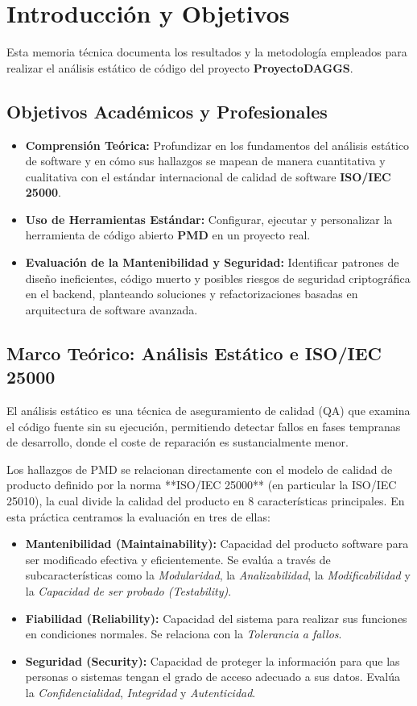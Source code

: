 \documentclass[12pt,a4paper]{article}
\begin{document}
\section{Introducción y Objetivos}
Esta memoria técnica documenta los resultados y la metodología empleados para realizar el análisis estático de código del proyecto \textbf{ProyectoDAGGS}.

\subsection{Objetivos Académicos y Profesionales}
\begin{itemize}
    \item \textbf{Comprensión Teórica:} Profundizar en los fundamentos del análisis estático de software y en cómo sus hallazgos se mapean de manera cuantitativa y cualitativa con el estándar internacional de calidad de software \textbf{ISO/IEC 25000}.
    \item \textbf{Uso de Herramientas Estándar:} Configurar, ejecutar y personalizar la herramienta de código abierto \textbf{PMD} en un proyecto real.
    \item \textbf{Evaluación de la Mantenibilidad y Seguridad:} Identificar patrones de diseño ineficientes, código muerto y posibles riesgos de seguridad criptográfica en el backend, planteando soluciones y refactorizaciones basadas en arquitectura de software avanzada.
\end{itemize}

\subsection{Marco Teórico: Análisis Estático e ISO/IEC 25000}
El análisis estático es una técnica de aseguramiento de calidad (QA) que examina el código fuente sin su ejecución, permitiendo detectar fallos en fases tempranas de desarrollo, donde el coste de reparación es sustancialmente menor.

Los hallazgos de PMD se relacionan directamente con el modelo de calidad de producto definido por la norma **ISO/IEC 25000** (en particular la ISO/IEC 25010), la cual divide la calidad del producto en 8 características principales. En esta práctica centramos la evaluación en tres de ellas:
\begin{itemize}
    \item \textbf{Mantenibilidad (Maintainability):} Capacidad del producto software para ser modificado efectiva y eficientemente. Se evalúa a través de subcaracterísticas como la \textit{Modularidad}, la \textit{Analizabilidad}, la \textit{Modificabilidad} y la \textit{Capacidad de ser probado (Testability)}.
    \item \textbf{Fiabilidad (Reliability):} Capacidad del sistema para realizar sus funciones en condiciones normales. Se relaciona con la \textit{Tolerancia a fallos}.
    \item \textbf{Seguridad (Security):} Capacidad de proteger la información para que las personas o sistemas tengan el grado de acceso adecuado a sus datos. Evalúa la \textit{Confidencialidad}, \textit{Integridad} y \textit{Autenticidad}.
\end{itemize}
\end{document}

